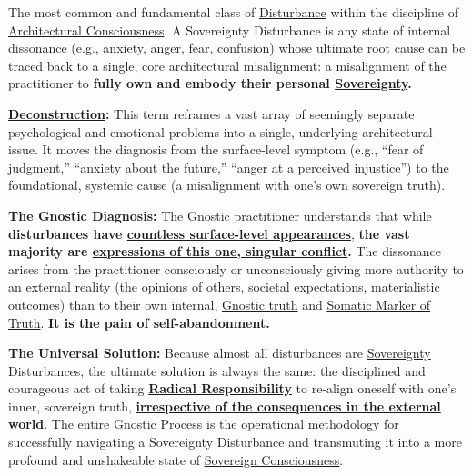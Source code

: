 \item[\hypertarget{gloss:sovereignty_disturbance}{Sovereignty Disturbance}] The most common and fundamental class of \hyperlink{gloss:disturbance}{Disturbance} within the discipline of \hyperlink{gloss:architectural_consciousness}{Architectural Consciousness}. A Sovereignty Disturbance is any state of internal dissonance (e.g., anxiety, anger, fear, confusion) whose ultimate root cause can be traced back to a single, core architectural misalignment: a misalignment of the practitioner to \textbf{fully own and embody their personal \hyperlink{gloss:sovereignty}{Sovereignty}.}
    \begin{nobullet}
        \item \textbf{\hyperlink{gloss:deconstruction}{Deconstruction}:} This term reframes a vast array of seemingly separate psychological and emotional problems into a single, underlying architectural issue. It moves the diagnosis from the surface-level symptom (e.g., ``fear of judgment,'' ``anxiety about the future,'' ``anger at a perceived injustice'') to the foundational, systemic cause (a misalignment with one's own sovereign truth).
        \item \textbf{The Gnostic Diagnosis:} The Gnostic practitioner understands that while \textbf{disturbances have \underline{countless surface-level appearances}}, \textbf{the vast majority are \underline{expressions of this one, singular conflict}.} The dissonance arises from the practitioner consciously or unconsciously giving more authority to an external reality (the opinions of others, societal expectations, materialistic outcomes) than to their own internal, \hyperlink{gloss:gnostic_truth}{Gnostic truth} and \hyperlink{gloss:somatic_marker_of_truth}{Somatic Marker of Truth}. \textbf{It is the pain of self-abandonment.}
        \item \textbf{The Universal Solution:} Because almost all disturbances are \hyperlink{gloss:sovereignty}{Sovereignty} Disturbances, the ultimate solution is always the same: the disciplined and courageous act of taking \textbf{\hyperlink{gloss:radical_responsibility}{Radical Responsibility}} to re-align oneself with one's inner, sovereign truth, \textbf{\underline{irrespective of the consequences in the external world}}. The entire \hyperlink{gloss:gnostic_process}{Gnostic Process} is the operational methodology for successfully navigating a Sovereignty Disturbance and transmuting it into a more profound and unshakeable state of \hyperlink{gloss:sovereign_consciousness}{Sovereign Consciousness}.
    \end{nobullet}

